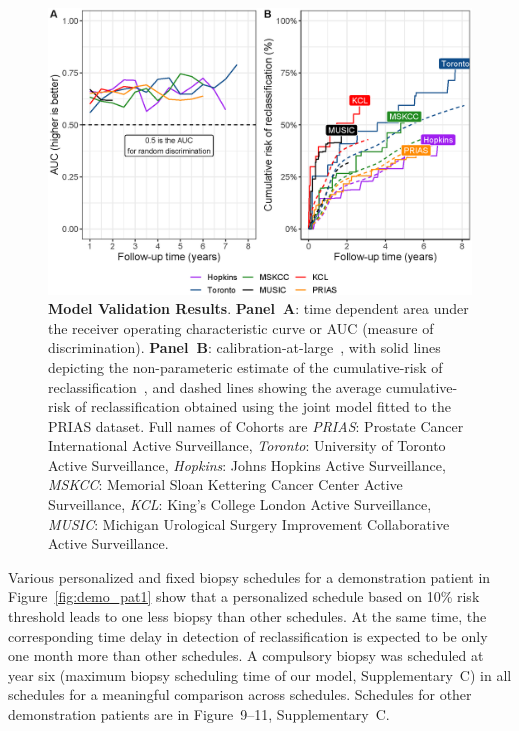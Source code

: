 \begin{figure}
\centerline{\includegraphics[width=\columnwidth]{images/auc_beforecalib.eps}}
\caption{\textbf{Model Validation Results}. \textbf{Panel~A}: time dependent area under the receiver operating characteristic curve or AUC (measure of discrimination). \textbf{Panel~B}: calibration-at-large~\citep{royston2013external,steyerberg2010assessing}, with solid lines depicting the non-parameteric estimate of the cumulative-risk of reclassification~\citep{turnbull1976empirical}, and dashed lines showing the average cumulative-risk of reclassification obtained using the joint model fitted to the PRIAS dataset. Full names of Cohorts are \textit{PRIAS}: Prostate Cancer International Active Surveillance, \textit{Toronto}: University of Toronto Active Surveillance, \textit{Hopkins}: Johns Hopkins Active Surveillance, \textit{MSKCC}: Memorial Sloan Kettering Cancer Center Active Surveillance, \textit{KCL}: King's College London Active Surveillance, \textit{MUSIC}: Michigan Urological Surgery Improvement Collaborative Active Surveillance.}
\label{fig:auc_beforecalib}
\end{figure}

Various personalized and fixed biopsy schedules for a demonstration patient in Figure~\ref{fig:demo_pat1} show that a personalized schedule based on 10\% risk threshold leads to one less biopsy than other schedules. At the same time, the corresponding time delay in detection of reclassification is expected to be only one month more than other schedules. A compulsory biopsy was scheduled at year six (maximum biopsy scheduling time of our model, Supplementary~C) in all schedules for a meaningful comparison across schedules. Schedules for other demonstration patients are in Figure~9--11, Supplementary~C.